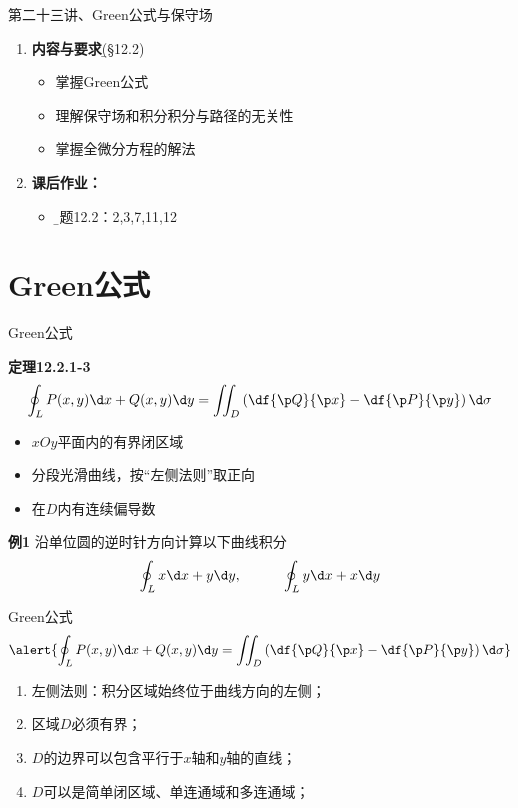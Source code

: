 
\begin{frame}{第二十三讲、Green公式与保守场}
	\linespread{1.5}
	\begin{enumerate}
	  \item {\bf 内容与要求}{\b (\S 12.2)}
	  \begin{itemize}
		\item 掌握Green公式
		\item 理解保守场和积分积分与路径的无关性
		\item 掌握全微分方程的解法
	  \vspace{1em}
	  \end{itemize}
	  \item {\bf  课后作业：}
	  \begin{itemize}
	    \item {\b 习题12.2：2,3,7,11,12}
	  \end{itemize}
	\end{enumerate}
\end{frame}

\section{Green公式}

\begin{frame}{Green公式}
	\linespread{1.2}\pause
	\begin{block}{{\bf 定理12.2.1-3}\hfill}
		$$\oint_LP(x,y)\d x+Q(x,y)\d y=\iint_D\left(
		\df{\p Q}{\p x}-\df{\p P}{\p y}\right)\d\sigma$$
	\end{block}
	\begin{itemize}
	  \item<3-5,7> $xOy$平面内的\alert<7>{有界闭区域}
	  \item<4-5,7> 分段光滑曲线，按\alert{“左侧法则”}取正向
	  \item<5,7> 在$D$内有连续偏导数
	\end{itemize}
	\vspace{-3cm}
	\begin{exampleblock}{\bf 例1}
		沿单位圆的逆时针方向计算以下曲线积分
		$$\oint_Lx\d x+y\d y,\hspace{3em}\oint_Ly\d x+x\d y$$
	\end{exampleblock}
\end{frame}

\begin{frame}{Green公式}
	\linespread{1.2}
	$$\alert{\oint_LP(x,y)\d x+Q(x,y)\d y=\iint_D\left(
		\df{\p Q}{\p x}-\df{\p P}{\p y}\right)\d\sigma}$$
	\pause
	\begin{enumerate}
	  \item {\bb 左侧法则：}积分区域始终位于曲线方向的左侧；\pause
	  \item 区域$D$必须有界；\pause
	  \item $D$的边界可以包含平行于$x$轴和$y$轴的直线；\pause
	  \item $D$可以是简单闭区域、单连通域和多连通域；
	\end{enumerate}
\end{frame}

